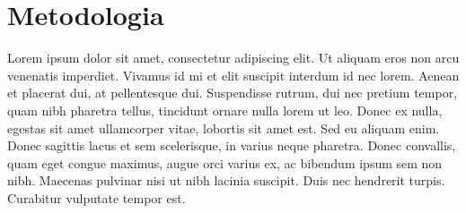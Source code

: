 \chapter{Metodologia}
Lorem ipsum dolor sit amet, consectetur adipiscing elit. Ut aliquam eros non arcu venenatis imperdiet. Vivamus id mi et elit suscipit interdum id nec lorem. Aenean et placerat dui, at pellentesque dui. Suspendisse rutrum, dui nec pretium tempor, quam nibh pharetra tellus, tincidunt ornare nulla lorem ut leo. Donec ex nulla, egestas sit amet ullamcorper vitae, lobortis sit amet est. Sed eu aliquam enim. Donec sagittis lacus et sem scelerisque, in varius neque pharetra. Donec convallis, quam eget congue maximus, augue orci varius ex, ac bibendum ipsum sem non nibh. Maecenas pulvinar nisi ut nibh lacinia suscipit. Duis nec hendrerit turpis. Curabitur vulputate tempor est. 